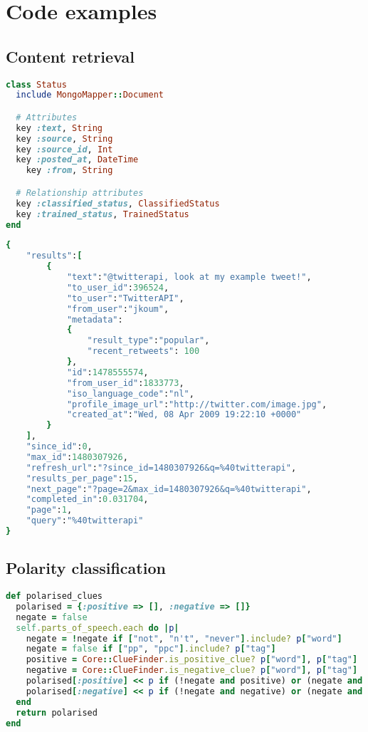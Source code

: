 \chapter{Code examples}

\section{Content retrieval}

\begin{lstlisting}[language=Ruby, caption={Illustration of Status class' MongoMapper attributes}, label=retrieval:status_code]
class Status
  include MongoMapper::Document

  # Attributes
  key :text, String         
  key :source, String
  key :source_id, Int
  key :posted_at, DateTime
	key :from, String

  # Relationship attributes
  key :classified_status, ClassifiedStatus
  key :trained_status, TrainedStatus 
end
\end{lstlisting}

\begin{lstlisting}[language=Ruby, caption={Example Twitter search API results}, label=retrieval:example_search]
{
	"results":[
		{
			"text":"@twitterapi, look at my example tweet!",
			"to_user_id":396524,
			"to_user":"TwitterAPI",
			"from_user":"jkoum",
			"metadata":
			{
				"result_type":"popular",
				"recent_retweets": 100
			},
			"id":1478555574,
			"from_user_id":1833773,
			"iso_language_code":"nl",
			"profile_image_url":"http://twitter.com/image.jpg",
			"created_at":"Wed, 08 Apr 2009 19:22:10 +0000"
		}
	],
	"since_id":0,
	"max_id":1480307926,
	"refresh_url":"?since_id=1480307926&q=%40twitterapi",
	"results_per_page":15,
	"next_page":"?page=2&max_id=1480307926&q=%40twitterapi",
	"completed_in":0.031704,
	"page":1,
	"query":"%40twitterapi"
}
\end{lstlisting}

\section{Polarity classification}

\begin{lstlisting}[language=Ruby, caption={Code for finding polarised clues, including negation handling}, label=polarity:polarised_clues]
def polarised_clues
  polarised = {:positive => [], :negative => []}
  negate = false
  self.parts_of_speech.each do |p|
    negate = !negate if ["not", "n't", "never"].include? p["word"]
    negate = false if ["pp", "ppc"].include? p["tag"]
    positive = Core::ClueFinder.is_positive_clue? p["word"], p["tag"]
    negative = Core::ClueFinder.is_negative_clue? p["word"], p["tag"]
    polarised[:positive] << p if (!negate and positive) or (negate and negative)
    polarised[:negative] << p if (!negate and negative) or (negate and positive)
  end
  return polarised
end
\end{lstlisting}

